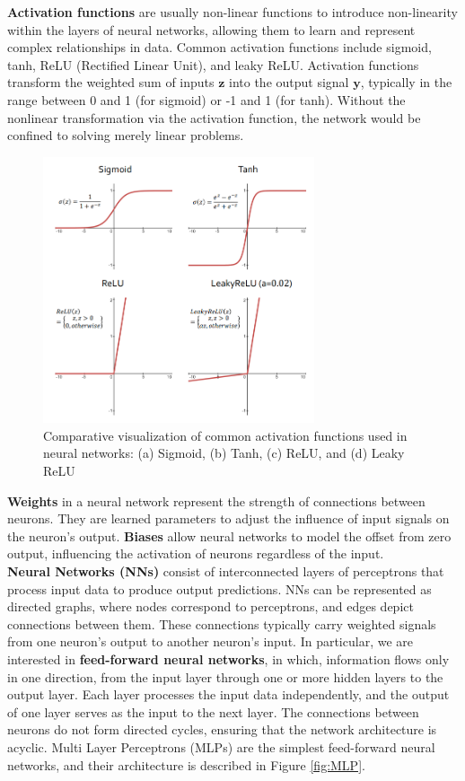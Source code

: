 \textbf{Activation functions} are usually non-linear functions to introduce non-linearity within the layers of neural networks, allowing them to learn and represent complex relationships in data. Common activation functions include sigmoid, tanh, ReLU (Rectified Linear Unit), and leaky ReLU. Activation functions transform the weighted sum of inputs $\mathbf{z}$ into the output signal $\mathbf{y}$, typically in the range between 0 and 1 (for sigmoid) or -1 and 1 (for tanh). Without the nonlinear transformation via the activation function, the network would be confined to solving merely linear problems. \\
\begin{figure}[ht]
    \centering
    \includegraphics[width=8cm]{images/Theory-DL/ActGraphs.png}
    \caption{Comparative visualization of common activation functions used in neural networks: (a) Sigmoid, (b) Tanh, (c) ReLU, and (d) Leaky ReLU}
    \label{fig:ActGraphs}
  \end{figure}
\textbf{Weights} in a neural network represent the strength of connections between neurons. They are learned parameters to adjust the influence of input signals on the neuron's output. \textbf{Biases} allow neural networks to model the offset from zero output, influencing the activation of neurons regardless of the input.\\
\textbf{Neural Networks (NNs)} consist of interconnected layers of perceptrons that process input data to produce output predictions. NNs can be represented as directed graphs, where nodes correspond to perceptrons, and edges depict connections between them. These connections typically carry weighted signals from one neuron's output to another neuron's input. In particular, we are interested in \textbf{feed-forward neural networks}, in which, information flows only in one direction, from the input layer through one or more hidden layers to the output layer. Each layer processes the input data independently, and the output of one layer serves as the input to the next layer. The connections between neurons do not form directed cycles, ensuring that the network architecture is acyclic. Multi Layer Perceptrons (MLPs) are the simplest feed-forward neural networks, and their architecture is described in Figure \ref{fig:MLP}. 
